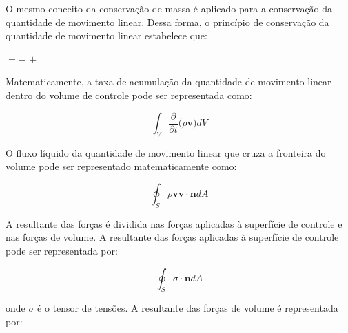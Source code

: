 O mesmo conceito da conservação de massa é aplicado para
a conservação da quantidade de movimento linear. Dessa forma,
o princípio de conservação da quantidade de movimento linear estabelece que:

\medskip
\begin{center}
           $= -$ 
           $+$ 
\end{center}

\medskip
Matematicamente, a taxa de acumulação da quantidade de movimento linear
dentro do volume de controle pode ser representada como:

\begin{equation} \label{qml 1} 
 \int_{V} \frac{\partial}{\partial t} \big( \rho \textbf{v} \big) dV
\end{equation}

\medskip
O fluxo líquido da quantidade de movimento
linear que cruza a fronteira do volume pode ser
representado matematicamente como:

\begin{equation}  
 \oint_{S} \rho \textbf{v} \textbf{v} \cdot \textbf{n} dA
\end{equation}

\medskip
A resultante das forças é dividida nas forças aplicadas
à superfície de controle e nas forças de volume.
A resultante das forças aplicadas à superfície de controle
pode ser representada por:

\begin{equation}  
 \oint_{S} \sigma \cdot \textbf{n} dA
\end{equation}

\medskip
\noindent
onde $\sigma$ é o tensor de tensões. A resultante
das forças de volume é representada por:

